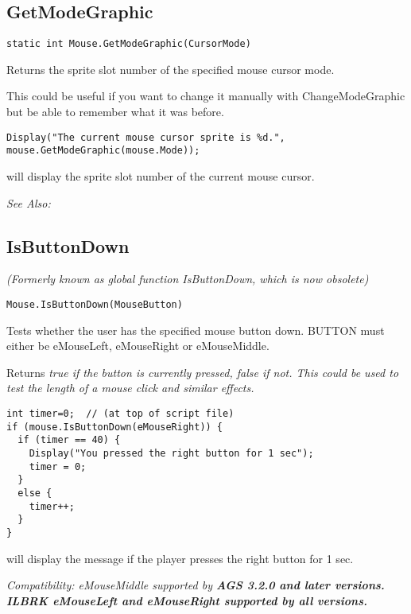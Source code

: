 \subsection{GetModeGraphic}\label{Mouse.GetModeGraphic}%

\begin{verbatim}
static int Mouse.GetModeGraphic(CursorMode)
\end{verbatim}
Returns the sprite slot number of the specified mouse cursor mode.

This could be useful if you want to change it manually with ChangeModeGraphic but be able
to remember what it was before.

\begin{verbatim}
Display("The current mouse cursor sprite is %d.", mouse.GetModeGraphic(mouse.Mode));
\end{verbatim}
will display the sprite slot number of the current mouse cursor.

\it{See Also:} 


\subsection{IsButtonDown}\label{Mouse.IsButtonDown}%

\it{(Formerly known as global function IsButtonDown, which is now obsolete)}

\begin{verbatim}
Mouse.IsButtonDown(MouseButton)
\end{verbatim}
Tests whether the user has the specified mouse button down. BUTTON must either
be eMouseLeft, eMouseRight or eMouseMiddle.

Returns \it{true} if the button is currently pressed, \it{false} if not. This could be used to
test the length of a mouse click and similar effects.

\begin{verbatim}
int timer=0;  // (at top of script file)
if (mouse.IsButtonDown(eMouseRight)) {
  if (timer == 40) {
    Display("You pressed the right button for 1 sec");
    timer = 0;
  }
  else {
    timer++;
  }
}
\end{verbatim}
will display the message if the player presses the right button for 1 sec.

\it{Compatibility:} \it{eMouseMiddle} supported by \bf{AGS 3.2.0} and later versions. ILBRK
\it{eMouseLeft} and \it{eMouseRight} supported by all versions.

